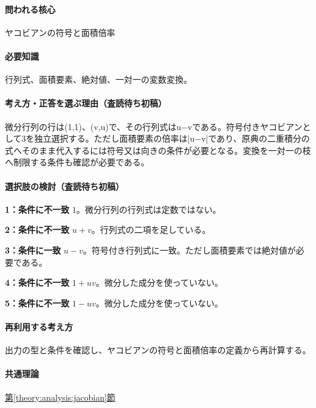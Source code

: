 \paragraph{問われる核心} ヤコビアンの符号と面積倍率

\paragraph{必要知識} 行列式、面積要素、絶対値、一対一の変数変換。

\paragraph{考え方・正答を選ぶ理由（査読待ち初稿）} 微分行列の行は(1,1)、(v,u)で、その行列式はu−vである。符号付きヤコビアンとして3を独立選択する。ただし面積要素の倍率は|u−v|であり、原典の二重積分の式へそのまま代入するには符号又は向きの条件が必要となる。変換を一対一の枝へ制限する条件も確認が必要である。

\paragraph{選択肢の検討（査読待ち初稿）}\mbox{}\par

\noindent\textbf{1：条件に不一致} \(1\)。微分行列の行列式は定数ではない。\par

\noindent\textbf{2：条件に不一致} \(u+v\)。行列式の二項を足している。\par

\noindent\textbf{3：条件に一致} \(u-v\)。符号付き行列式に一致。ただし面積要素では絶対値が必要である。\par

\noindent\textbf{4：条件に不一致} \(1+uv\)。微分した成分を使っていない。\par

\noindent\textbf{5：条件に不一致} \(1-uv\)。微分した成分を使っていない。\par

\paragraph{再利用する考え方} 出力の型と条件を確認し、ヤコビアンの符号と面積倍率の定義から再計算する。

\paragraph{共通理論} \hyperref[theory:analysis:jacobian]{第\ref*{theory:analysis:jacobian}節}

